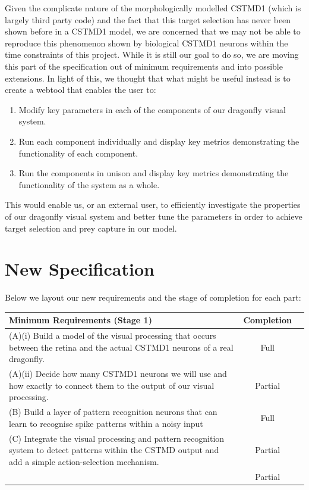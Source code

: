 \documentclass[a4paper,11pt]{article}
\begin{document}
Given the complicate nature of the morphologically modelled CSTMD1 (which is largely third party code) and the fact that this target selection has never been shown before in a CSTMD1 model, we are concerned that we may not be able to reproduce this phenomenon shown by biological CSTMD1 neurons within the time constraints of this project. While it is still our goal to do so, we are moving this part of the specification out of minimum requirements and into possible extensions.
In light of this, we thought that what might be useful instead is to create a webtool that enables the user to:
\begin{enumerate}
	\item Modify key parameters in each of the components of our dragonfly visual system.
	\item Run each component individually and display key metrics demonstrating the functionality of each component.
	\item Run the components in unison and display key metrics demonstrating the functionality of the system as a whole.
\end{enumerate}
This would enable us, or an external user, to efficiently investigate the properties of our dragonfly visual system and better tune the parameters in order to achieve target selection and prey capture in our model.

\section{New Specification}
Below we layout our new requirements and the stage of completion for each part:
\begin{center}
    \begin{tabular}{p{12cm} c c}
    \textbf{Minimum Requirements (Stage 1)} & \textbf{Completion} \\ \hline
	(A)(i) Build a model of the visual processing that occurs between the retina and the actual CSTMD1 neurons of a real dragonfly. & Full \\
	(A)(ii) Decide how many CSTMD1 neurons we will use and how exactly to connect them to the output of our visual processing. & Partial \\
	(B) Build a layer of pattern recognition neurons that can learn to recognise spike patterns within a noisy input & Full\\
	(C) Integrate the visual processing and pattern recognition system to detect patterns within the CSTMD output and add a simple action-selection mechanism. & Partial\\ & Partial\\
    \end{tabular}
\end{center}
\end{document}
